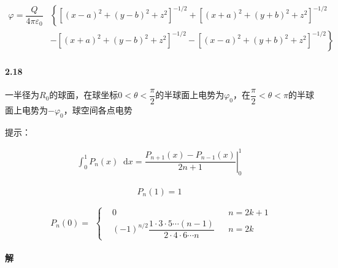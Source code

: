 \documentclass{article}
\newcommand*{\md}{\mathop{}\!\mathrm{d}}
\begin{document}
\begin{equation*}
  \begin{aligned}
    \varphi = \dfrac{Q}{4\pi \varepsilon_0} & \left\{
    \left[ \left( x-a \right)^2 + \left( y-b \right)^2 + z^2 \right]^{-1/2}
    + \left[ \left( x+a \right)^2 + \left( y+b \right)^2 + z^2 \right]^{-1/2}
    \right. \\
    &\left.
    - \left[ \left( x+a \right)^2 + \left( y-b \right)^2 + z^2 \right]^{-1/2}
    - \left[ \left( x-a \right)^2 + \left( y+b \right)^2 + z^2 \right]^{-1/2} 
    \right\}
  \end{aligned}
\end{equation*}

\paragraph{2.18}

一半径为$R_0$的球面，在球坐标$0<\theta< \dfrac{\pi}{2} $的半球面上电势为$\varphi_0$，在$\dfrac{\pi}{2} < \theta < \pi $的半球面上电势为$-\varphi_0$，球空间各点电势

提示：

\begin{equation*}
  \begin{aligned}
    \int_0^1 P_n \left( x \right) \md x = \left. \dfrac{P_{n+1} \left( x \right) - P_{n-1} \left( x \right)}{2n+1} \right|_0^1
  \end{aligned}
\end{equation*}

\begin{equation*}
  \begin{aligned}
    P_n \left( 1 \right) = 1
  \end{aligned}
\end{equation*}

\begin{equation*}
  \begin{aligned}
    P_n \left( 0 \right) =
  \end{aligned}
  \left\{
  \begin{aligned}
    &0 && n=2k+1 \\
    & \left( -1 \right)^{n/2} \dfrac{1 \cdot 3 \cdot 5 \cdots \left( n-1 \right)}{2 \cdot 4 \cdot 6 \cdots n} && n=2k 
  \end{aligned}
  \right.
\end{equation*}

\paragraph{解}
\end{document}
